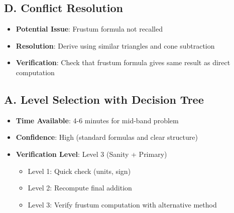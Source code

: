 \documentclass[]{article}
\begin{document}
\begin{techniquesbox}
\subsection*{D. Conflict Resolution}
\begin{itemize}[leftmargin=*]
    \item \textbf{Potential Issue}: Frustum formula not recalled
    \item \textbf{Resolution}: Derive using similar triangles and cone subtraction
    \item \textbf{Verification}: Check that frustum formula gives same result as direct computation
\end{itemize}
\end{techniquesbox}

\begin{verificationbox}
\subsection*{A. Level Selection with Decision Tree}
\begin{itemize}[leftmargin=*]
    \item \textbf{Time Available}: 4-6 minutes for mid-band problem
    \item \textbf{Confidence}: High (standard formulas and clear structure)
    \item \textbf{Verification Level}: Level 3 (Sanity + Primary)
    \begin{itemize}
        \item Level 1: Quick check (units, sign)
        \item Level 2: Recompute final addition
        \item Level 3: Verify frustum computation with alternative method
    \end{itemize}
\end{itemize}


\end{verificationbox}
\end{document}

